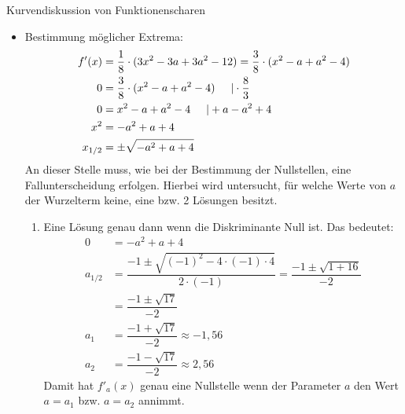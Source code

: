 \begin{bsp}{Kurvendiskussion von Funktionenscharen}{}
\begin{itemize}
\begin{enumerate}
Daraus folgt, dass $G_{f_a}$ genau eine Nullstelle bei $x=0 $ hat, wenn der Parameter $a$ den Werte $a_1 = \dfrac{-1 +\sqrt{17}}{-2}$ bzw. $a_2=\dfrac{-1 -\sqrt{17}}{-2}$ annimmt.
\item Zwei Lösungen genau dann wenn der Parameter folgende Ungleichung erfüllt: $a_1 < a <a_2$. Daraus folgt, dass der $G_{f_a}$ genau drei Nullstellen besitzt.
\item Keine Lösung genau dann wenn folgende Beziehungen erfüllt sind $a< a_1$ und $a>a_2$. Das führt dazu, dass der Graph $G_{f_a}$ genau eine Nullstelle bei $x= 0$ hat.
\end{enumerate}
\item Bestimmung möglicher Extrema:
    \begin{equation*}
    \begin{split}
        f'(x) &= \dfrac{1}{8} \cdot (3x^2 -3a +3a^2 -12) = \dfrac{3}{8}\cdot (x^2-a+a^2-4)\\
        0 &= \dfrac{3}{8}\cdot (x^2-a+a^2-4) \hspace{0.5cm} |\cdot \dfrac{8}{3}\\
        0&= x^2-a+a^2-4 \hspace{0.5cm} | +a -a^2+4\\
        x^2&= -a^2+a+4\\ 
        x_{1/2} &= \pm \sqrt{-a^2+a+4}
        \end{split}
\end{equation*}
An dieser Stelle muss, wie bei der Bestimmung der Nullstellen, eine Fallunterscheidung erfolgen. Hierbei wird untersucht, für welche Werte von $a$ der Wurzelterm keine, eine bzw. 2 Lösungen besitzt.
\begin{enumerate}
    \item Eine Lösung genau dann wenn die Diskriminante Null ist. Das bedeutet:
        \begin{equation*}
    \begin{split}
        0 &= -a^2 +a +4\\
        a_{1/2} &= \dfrac{-1 \pm \sqrt{(-1)^2 - 4\cdot (-1) \cdot 4}}{2\cdot (-1)} = \dfrac{-1\pm \sqrt{1+16}}{-2}\\
        &= \dfrac{-1\pm \sqrt{17}}{-2}\\
        a_1&= \dfrac{-1 +\sqrt{17}}{-2}\approx -1,56\\
       a_2&= \dfrac{-1 -\sqrt{17}}{-2} \approx 2,56      
       \end{split}
\end{equation*}
Damit hat $f'_a(x)$ genau eine Nullstelle wenn der Parameter $a$ den Wert  $a= a_1$ bzw. $a = a_2$ annimmt.

\end{enumerate}
\end{itemize}
\end{bsp}
